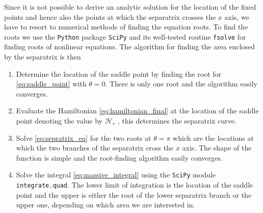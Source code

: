 \documentclass[twoside,openright,titlepage,numbers=noenddot,headinclude,%
                footinclude=true,cleardoublepage=empty,abstractoff, 
                BCOR=5mm,paper=a4,fontsize=11pt,%
                american,%
                ]{scrreprt}%
\begin{document}
Since it is not possible to derive an analytic solution for the location
of the fixed points and hence also the points at which the separatrix
crosses the $x$ axis, we have to resort to numerical methods of finding
the equation roots. To find the roots we use
the \texttt{Python} package \texttt{SciPy} \citep{scipy} and its
well-tested routine \texttt{fsolve} for finding roots of nonlinear equations.
The algorithm for finding the area enclosed by the separatrix is then
\begin{enumerate}
    \item Determine the location of the saddle point by finding the root
        for \cref{eq:saddle_point} with $\theta=0$. There is only one
        root and the algorithm easily converges.
    \item Evaluate the Hamiltonian \ref{eq:hamiltonian_final} at the 
        location of the saddle point denoting the value by $\mathcal{H}_s$
        , this determines the separatrix curve.
    \item Solve \cref{eq:sepratrix_eq} for the two roots at $\theta=\pi$ 
        which are the locations at which the two branches of the separatrix 
        cross the $x$ axis. The shape of the function is simple and the
        root-finding algorithm easily converges.
    \item Solve the integral \ref{eq:massive_integral} using the \texttt{SciPy}
        module \texttt{integrate.quad}. The lower limit of integration is the
        location of the saddle point and the upper is either the root 
        of the lower separatrix branch or the upper one, depending on which
        area we are interested in.
\end{enumerate}
\end{document}
